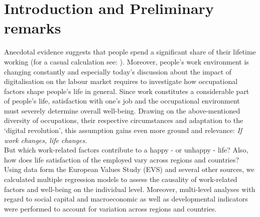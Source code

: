 \documentclass[preprint,12pt,authoryear]{elsarticle}
\begin{document}
	\newpage
	\tableofcontents
	\newpage
	
	
	\section{Introduction and Preliminary remarks}
	Anecdotal evidence suggests that people spend a significant share of their lifetime working (for a casual calculation 
	see: \citet{thompson_what_2016}). Moreover, people's work environment is changing constantly and especially today's 
	discussion about the impact of digitalisation on the labour market requires to investigate how occupational factors shape 
	people's life in general. Since work constitutes a considerable part of people’s life, satisfaction with one’s job and the
	occupational environment must severely determine overall well-being. Drawing on the above-mentioned diversity of 
	occupations, their respective circumstances and adaptation to the ‘digital revolution’, this assumption gains even more 
	ground and relevance: \textit{If work changes, life changes.} \\
	But which work-related factors contribute to a happy - or unhappy - life? Also, how does life satisfaction of the employed
	vary across regions and countries? \\
	Using data form the European Values Study (EVS) and several other sources, we calculated multiple regression models to assess the causality of
	work-related factors and well-being on the individual level. Moreover, multi-level analyses with regard to social capital and
	macroeconomic as well as developmental indicators were performed to account for variation across regions and countries. 
\end{document}
